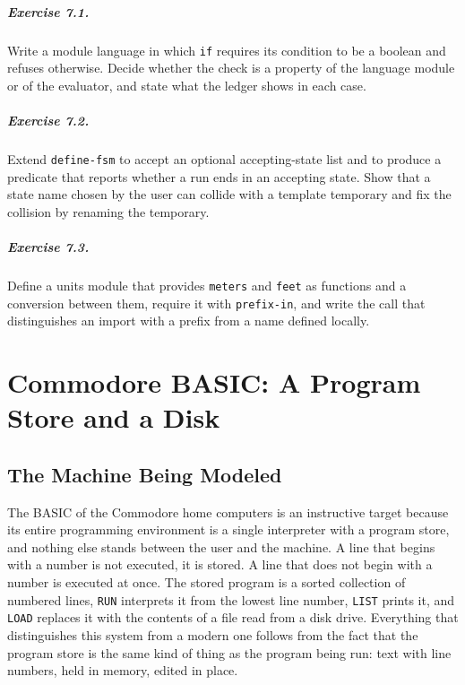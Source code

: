\documentclass[11pt,oneside]{report}
\theoremstyle{plain}
\theoremstyle{definition}
\theoremstyle{remark}
\begin{document}
\paragraph{Exercise 7.1.} Write a module language in which \texttt{if} requires its condition to be a boolean and refuses otherwise. Decide whether the check is a property of the language module or of the evaluator, and state what the ledger shows in each case.

\paragraph{Exercise 7.2.} Extend \texttt{define-fsm} to accept an optional accepting-state list and to produce a predicate that reports whether a run ends in an accepting state. Show that a state name chosen by the user can collide with a template temporary and fix the collision by renaming the temporary.

\paragraph{Exercise 7.3.} Define a units module that provides \texttt{meters} and \texttt{feet} as functions and a conversion between them, require it with \texttt{prefix-in}, and write the call that distinguishes an import with a prefix from a name defined locally.

\chapter{Commodore BASIC: A Program Store and a Disk}

\section{The Machine Being Modeled}

The BASIC of the Commodore home computers is an instructive target because its entire programming environment is a single interpreter with a program store, and nothing else stands between the user and the machine. A line that begins with a number is not executed, it is stored. A line that does not begin with a number is executed at once. The stored program is a sorted collection of numbered lines, \texttt{RUN} interprets it from the lowest line number, \texttt{LIST} prints it, and \texttt{LOAD} replaces it with the contents of a file read from a disk drive. Everything that distinguishes this system from a modern one follows from the fact that the program store is the same kind of thing as the program being run: text with line numbers, held in memory, edited in place.
\end{document}
